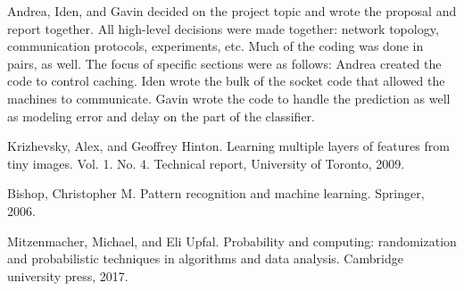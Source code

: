 \documentclass[12pt]{article}
\begin{document}
Andrea, Iden, and Gavin decided on the project topic and wrote the proposal and report together.
All high-level decisions were made together: network topology, communication protocols, experiments, etc.
Much of the coding was done in pairs, as well.
The focus of specific sections were as follows: Andrea created the code to control caching.
Iden wrote the bulk of the socket code that allowed the machines to communicate.
Gavin wrote the code to handle the prediction as well as modeling error and delay on the part of the classifier.


\begin{thebibliography}{1}
    Krizhevsky, Alex, and Geoffrey Hinton. Learning multiple layers of features from tiny images. Vol. 1. No. 4. Technical report, University of Toronto, 2009.

    Bishop, Christopher M. Pattern recognition and machine learning. Springer, 2006.

    Mitzenmacher, Michael, and Eli Upfal. Probability and computing: randomization and probabilistic techniques in algorithms and data analysis. Cambridge university press, 2017.

\end{thebibliography}
\end{document}
